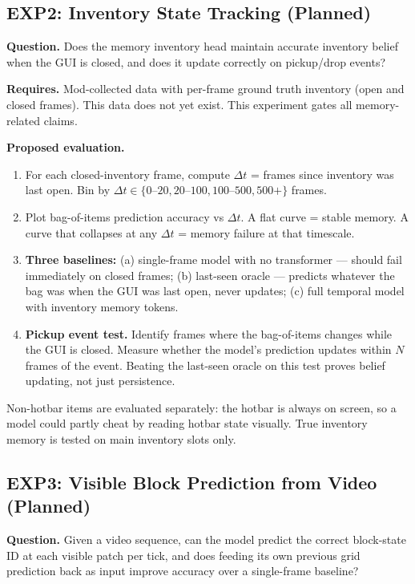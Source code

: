 \documentclass[11pt,a4paper]{article}
\begin{document}
\subsection{EXP2: Inventory State Tracking (Planned)}

\textbf{Question.} Does the memory inventory head maintain accurate inventory belief when the GUI is closed, and does it update correctly on pickup/drop events?

\textbf{Requires.} Mod-collected data with per-frame ground truth inventory (open and closed frames). This data does not yet exist. This experiment gates all memory-related claims.

\textbf{Proposed evaluation.}
\begin{enumerate}
  \item For each closed-inventory frame, compute $\Delta t$ = frames since inventory was last open. Bin by $\Delta t \in \{0\text{--}20, 20\text{--}100, 100\text{--}500, 500+\}$ frames.
  \item Plot bag-of-items prediction accuracy vs $\Delta t$. A flat curve = stable memory. A curve that collapses at any $\Delta t$ = memory failure at that timescale.
  \item \textbf{Three baselines:} (a) single-frame model with no transformer --- should fail immediately on closed frames; (b) last-seen oracle --- predicts whatever the bag was when the GUI was last open, never updates; (c) full temporal model with inventory memory tokens.
  \item \textbf{Pickup event test.} Identify frames where the bag-of-items changes while the GUI is closed. Measure whether the model's prediction updates within $N$ frames of the event. Beating the last-seen oracle on this test proves belief updating, not just persistence.
\end{enumerate}

Non-hotbar items are evaluated separately: the hotbar is always on screen, so a model could partly cheat by reading hotbar state visually. True inventory memory is tested on main inventory slots only.

\subsection{EXP3: Visible Block Prediction from Video (Planned)}

\textbf{Question.} Given a video sequence, can the model predict the correct block-state ID at each visible patch per tick, and does feeding its own previous grid prediction back as input improve accuracy over a single-frame baseline?
\end{document}
